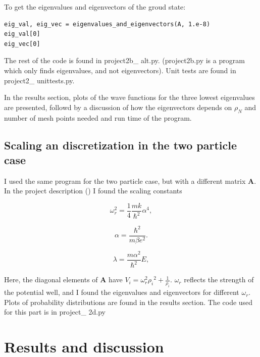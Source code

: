 \documentclass{article}
\begin{document}
To get the eigenvalues and eigenvectors of the groud state: 
\begin{verbatim}
eig_val, eig_vec = eigenvalues_and_eigenvectors(A, 1.e-8)
eig_val[0] 
eig_vec[0]
\end{verbatim}
The rest of the code is found in project2b\_ alt.py. (project2b.py is a program which only finds eigenvalues, and not eigenvectors). Unit tests are found in project2\_ unittests.py.

In the results section, plots of the wave functions for the three lowest eigenvalues are presented, followd by a discussion of how the eigenvectors depends on $\rho_N$ and number of mesh points needed and run time of the program. 

\subsection{Scaling an discretization in the two particle case}
I used the same program for the two particle case, but with a different matrix $\bm{A}$. In the project description (\cite{Projectdescription}) 	I found the scaling constants 

\begin{equation*}
\omega_r^2=\frac{1}{4}\frac{mk}{\hbar^2} \alpha^4,
\end{equation*}

\begin{equation*}
\alpha = \frac{\hbar^2}{m\beta e^2}.
\end{equation*}


\begin{equation*}
\lambda = \frac{m\alpha^2}{\hbar^2}E,
\end{equation*}


Here, the diagonal elements of $\bm{A}$ have $V_i = \omega_r ^2 {\rho_i}^2+\frac{1}{\rho_i}$. $\omega_r$ reflects the strength of the potential well, and I found the eigenvalues and eigenvectors for different $\omega_r$. Plots of probability distributions are found in the results section. The code used for this part is in project\_ 2d.py



\section{Results and discussion}
\end{document}
